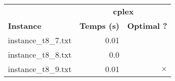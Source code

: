 \documentclass{article}
\begin{document}
\newpage
\begin{center}
\renewcommand{\arraystretch}{1.4} 
 \begin{tabular}{lrr}
	\hline
 & \multicolumn{2}{c}{\textbf{cplex}}\\
\textbf{Instance}  & \textbf{Temps (s)} & \textbf{Optimal ?} \\\hline

instance\_t8\_7.txt & 0.01 & 
\\
instance\_t8\_8.txt & 0.0 & 
\\
instance\_t8\_9.txt & 0.01 & 
$\times$
\\
\hline\end{tabular}
\end{center}
\end{document}
